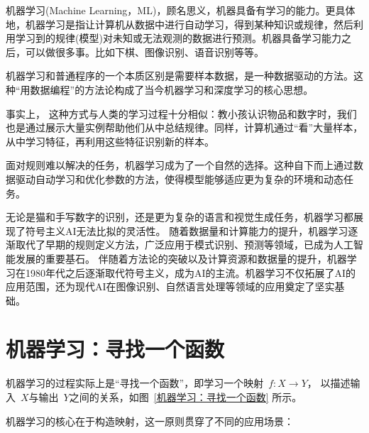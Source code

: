 机器学习(Machine Learning，ML)，顾名思义，机器具备有学习的能力。更具体地，机器学习是指让计算机从数据中进行自动学习，得到某种知识或规律，然后利用学习到的规律(模型)对未知或无法观测的数据进行预测。机器具备学习能力之后，可以做很多事。比如下棋、图像识别、语音识别等等。

机器学习和普通程序的一个本质区别是需要样本数据，是一种数据驱动的方法。这种“用数据编程”的方法论构成了当今机器学习和深度学习的核心思想。

事实上， 这种方式与人类的学习过程十分相似：教小孩认识物品和数字时，我们也是通过展示大量实例帮助他们从中总结规律。同样，计算机通过“看”大量样本，从中学习特征，再利用这些特征识别新的样本。

面对规则难以解决的任务，机器学习成为了一个自然的选择。这种自下而上通过数据驱动自动学习和优化参数的方法，使得模型能够适应更为复杂的环境和动态任务。

无论是猫和手写数字的识别，还是更为复杂的语言和视觉生成任务，机器学习都展现了符号主义AI无法比拟的灵活性。
随着数据量和计算能力的提升，机器学习逐渐取代了早期的规则定义方法，广泛应用于模式识别、预测等领域，已成为人工智能发展的重要基石。
伴随着方法论的突破以及计算资源和数据量的提升，机器学习在1980年代之后逐渐取代符号主义，成为AI的主流。机器学习不仅拓展了AI的应用范围，还为现代AI在图像识别、自然语言处理等领域的应用奠定了坚实基础。


\section{机器学习：寻找一个函数}
机器学习的过程实际上是“寻找一个函数”，即学习一个映射~$f: X \rightarrow Y$， 以描述输入~$X$与输出~$Y$之间的关系，如图~\ref{机器学习：寻找一个函数} 所示。

机器学习的核心在于构造映射，这一原则贯穿了不同的应用场景：

